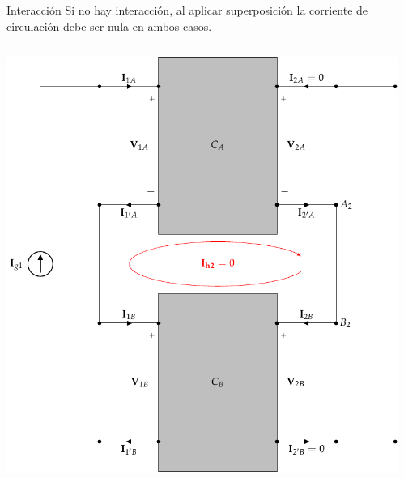 \documentclass[aspectratio=169, usenames,svgnames,dvipsnames]{beamer}
\begin{document}
\begin{frame}[label={sec:orgd8d0f07},plain]{Interacción}
Si no hay interacción, al aplicar superposición la corriente de circulación debe ser nula \alert{en ambos casos}.
\begin{columns}
\begin{column}{0.5\columnwidth}
\begin{center}
\includegraphics[height=0.8\textheight]{../figs/serie-serie-superposicion-entrada.pdf}
\end{center}
\end{column}
\begin{column}{0.5\columnwidth}
\begin{center}

\end{center}
\end{column}
\end{columns}
\end{frame}
\end{document}
